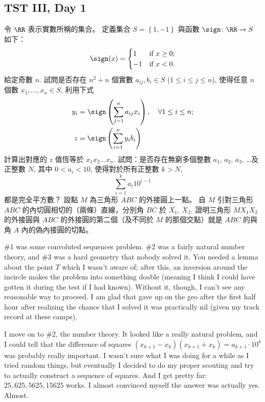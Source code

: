 \documentclass[11pt]{scrreprt}
\begin{document}
\subsection{TST III, Day 1}
\begin{enumerate}
  \ii 令 $\RR$ 表示實數所稱的集合。 定義集合 $S = \left\{ 1,-1 \right\}$ 與函數 $\sign \colon \RR \to S$ 如下：
  \[ \sign(x) =
    \begin{cases}
      1 & \text{if } x \ge 0; \\
      -1 & \text{if } x < 0.
    \end{cases} \]
  給定奇數 $n$. 試問是否存在 $n^2+n$ 個實數 $a_{ij}, b_i \in S$ ($1 \le i \le j \le n$), 使得任意 $n$ 個數 $x_1, \dots, x_n \in S$, 利用下式
  \begin{align*}
    y_i &= \sign \left( \sum_{j=1}^n a_{ij} x_i \right), \quad \forall 1 \le i \le n; \\
    z &= \sign \left( \sum_{i=1}^n y_i b_i \right)
  \end{align*}
  計算出對應的 $z$ 值恆等於 $x_1x_2 \dots x_n$.
  \ii 試問：是否存在無窮多個整數 $a_1$, $a_2$, $a_3$, \dots 及正整數 $N$, 其中 $0 < a_i < 10$, 使得對於所有正整數 $k > N$,
  \[ \sum_{i=1}^k a_i 10^{i-1} \]
  都是完全平方數？ %
  \ii 設點 $M$ 為三角形 $ABC$ 的外接圓上一點。 自 $M$ 引對三角形 $ABC$
  的內切圓相切的（兩條）直線，分別角 $BC$ 於 $X_1$, $X_2$.
  證明三角形 $MX_1X_2$ 的外接圓與 $ABC$ 的外接圓的第二個（及不同於 $M$ 的那個交點）就是
  $ABC$ 的與角 $A$ 內的偽內接圓的切點。
\end{enumerate}
\#1 was some convoluted sequences problem. \#2 was a fairly natural number theory, and \#3 was a hard geometry that nobody solved it. You needed a lemma about the point $T$ which I wasn't aware of; after this, an inversion around the incircle makes the problem into something doable (meaning I think I could have gotten it during the test if I had known). Without it, though, I can't see any reasonable way to proceed. I am glad that gave up on the geo after the first half hour after realizing the chance that I solved it was practically nil (given my track record at these camps).

I move on to \#2, the number theory. It looked like a really natural problem, and I could tell that the difference of squares $\left( x_{k+1}-x_k \right)\left( x_{k+1}+x_k \right) = a_{k+1} \cdot 10^k$ was probably really important.
I wasn't sure what I was doing for a while as I tried random things, but eventually I decided to do my proper scouting and try to actually construct a sequence of squares. And I get pretty far: $25,625,5625,15625$ works. I almost convinced myself the answer was actually yes. Almost.
\end{document}
